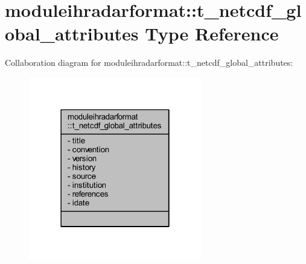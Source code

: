 \hypertarget{structmoduleihradarformat_1_1t__netcdf__global__attributes}{}\section{moduleihradarformat\+:\+:t\+\_\+netcdf\+\_\+global\+\_\+attributes Type Reference}
\label{structmoduleihradarformat_1_1t__netcdf__global__attributes}


Collaboration diagram for moduleihradarformat\+:\+:t\+\_\+netcdf\+\_\+global\+\_\+attributes\+:\nopagebreak
\begin{figure}[H]
\begin{center}
\leavevmode
\includegraphics[width=214pt]{structmoduleihradarformat_1_1t__netcdf__global__attributes__coll__graph}
\end{center}
\end{figure}
